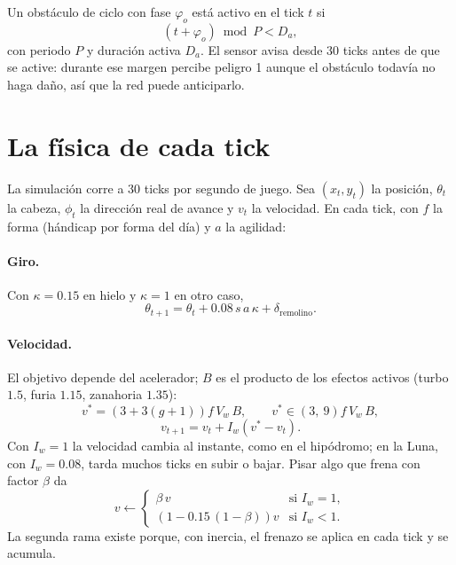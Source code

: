 \documentclass[11pt,letterpaper]{article}
\begin{document}
Un obstáculo de ciclo con fase $\varphi_o$ está activo en el tick $t$ si
\begin{equation}
(t + \varphi_o) \bmod P < D_a,
\end{equation}
con periodo $P$ y duración activa $D_a$. El sensor avisa desde 30 ticks antes de que se active: durante ese margen percibe peligro 1 aunque el obstáculo todavía no haga daño, así que la red puede anticiparlo.

\section{La física de cada tick}
La simulación corre a 30 ticks por segundo de juego. Sea $(x_t, y_t)$ la posición, $\theta_t$ la cabeza, $\phi_t$ la dirección real de avance y $v_t$ la velocidad. En cada tick, con $f$ la forma (hándicap por forma del día) y $a$ la agilidad:

\paragraph{Giro.} Con $\kappa = 0.15$ en hielo y $\kappa = 1$ en otro caso,
\begin{equation}
\theta_{t+1} = \theta_t + 0.08\, s\, a\, \kappa + \delta_{\text{remolino}}.
\end{equation}

\paragraph{Velocidad.} El objetivo depende del acelerador; $B$ es el producto de los efectos activos (turbo $1.5$, furia $1.15$, zanahoria $1.35$):
\begin{equation}
v^{*} = \left(3 + 3(g+1)\right) f\, V_w\, B, \qquad v^{*} \in \left(3,\ 9\right) f\, V_w\, B,
\end{equation}
\begin{equation}
v_{t+1} = v_t + I_w \left(v^{*} - v_t\right).
\end{equation}
Con $I_w = 1$ la velocidad cambia al instante, como en el hipódromo; en la Luna, con $I_w = 0.08$, tarda muchos ticks en subir o bajar. Pisar algo que frena con factor $\beta$ da
\begin{equation}
v \leftarrow \begin{cases} \beta\, v & \text{si } I_w = 1,\\ \left(1 - 0.15\,(1-\beta)\right) v & \text{si } I_w < 1. \end{cases}
\end{equation}
La segunda rama existe porque, con inercia, el frenazo se aplica en cada tick y se acumula.
\end{document}
